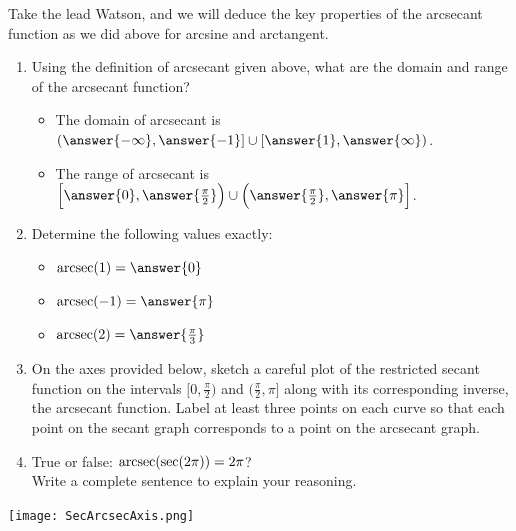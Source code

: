 \documentclass{ximera}
\begin{document}
\begin{problem}
Take the lead Watson, and we will deduce the key properties of the arcsecant function as we did above for arcsine and arctangent.
\begin{enumerate}
\item
Using the definition of arcsecant given above, what are the domain and range of the arcsecant function? \\
\begin{itemize}
\item The domain of arcsecant is $(\answer{-\infty} , \answer{-1}] \cup [\answer{1} , \answer{\infty})$.
%
\item The range of arcsecant is $\Big[\answer{0} , \answer{\frac{\pi}{2}}\Big) \cup \Big(\answer{\frac{\pi}{2}} , \answer{\pi}\Big]$.
\end{itemize}
%
\item Determine the following values exactly: 
\begin{itemize}
%
\item $\arcsec(1) = \answer{0}$
%
\item $\arcsec(-1) = \answer{\pi}$
%
\item $\arcsec(2) = \answer{\frac{\pi}{3}}$ 
\end{itemize}
%
\item
On the axes provided below, sketch a careful plot of the restricted secant function on the intervals $\Big[0, \frac{\pi}{2}\Big)$ and $\Big(\frac{\pi}{2}, \pi\Big]$ along with its corresponding inverse, the arcsecant function.  Label at least three points on each curve so that each point on the secant graph corresponds to a point on the arcsecant graph.  %

%
%
\item True or false: $\operatorname{arcsec}(\sec(2\pi)) = 2\pi$?  \\
Write a complete sentence to explain your reasoning.%
\end{enumerate}

\begin{image}
\texttt{[image: SecArcsecAxis.png]}
\end{image}
\end{problem}
\end{document}
